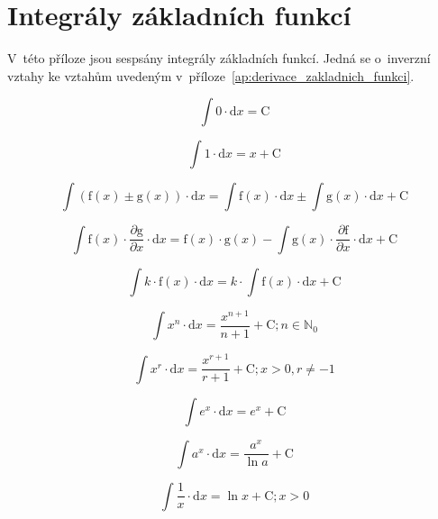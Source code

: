 \chapter{Integrály základních funkcí}
\label{ap:integraly_zakladnich_funkci}

V~této příloze jsou sespsány integrály základních funkcí. Jedná se o~inverzní vztahy ke vztahům uvedeným v~příloze~\ref{ap:derivace_zakladnich_funkci}.

\begin{equation}
\int 0 \cdot \mathrm{d}x = \mathrm{C}
\end{equation}

\begin{equation}
\int 1 \cdot \mathrm{d}x = x + \mathrm{C}
\end{equation}

\begin{equation}
\int (\mathrm{f}(x) \pm \mathrm{g}(x)) \cdot \mathrm{d}x = \int \mathrm{f}(x) \cdot \mathrm{d}x \pm \int \mathrm{g}(x) \cdot \mathrm{d}x + \mathrm{C}
\end{equation}

\begin{equation}
\int \mathrm{f}(x) \cdot \frac{\partial \mathrm{g}}{\partial x} \cdot \mathrm{d}x = \mathrm{f}(x) \cdot \mathrm{g}(x) - \int \mathrm{g}(x) \cdot \frac{\partial \mathrm{f}}{\partial x} \cdot \mathrm{d}x + \mathrm{C}
\end{equation}

\begin{equation}
\int k \cdot \mathrm{f}(x) \cdot \mathrm{d}x = k \cdot \int \mathrm{f}(x) \cdot \mathrm{d}x + \mathrm{C}
\end{equation}

\begin{equation}
\int x^n \cdot \mathrm{d}x = \frac{x^{n + 1}}{n + 1} + \mathrm{C}; n \in \mathbb{N}_0
\end{equation}

\begin{equation}
\int x^r \cdot \mathrm{d}x = \frac{x^{r + 1}}{r + 1} + \mathrm{C}; x > 0, r \neq -1
\end{equation}

\begin{equation}
\int e^x \cdot \mathrm{d}x = e^x + \mathrm{C}
\end{equation}

\begin{equation}
\int a^x \cdot \mathrm{d}x = \frac{a^x}{\ln a} + \mathrm{C}
\end{equation}

\begin{equation}
\int \frac{1}{x} \cdot \mathrm{d}x = \ln x  + \mathrm{C}; x > 0
\end{equation}
